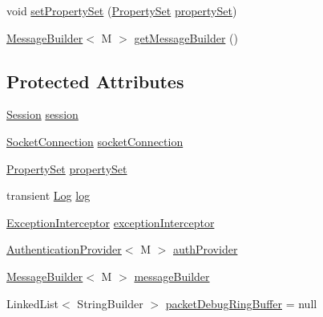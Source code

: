 \begin{DoxyCompactItemize}
\item 
void \mbox{\hyperlink{classcom_1_1mysql_1_1cj_1_1protocol_1_1_abstract_protocol_ae1541b6bfdeeba4b70d410e35cf2f11e}{set\+Property\+Set}} (\mbox{\hyperlink{interfacecom_1_1mysql_1_1cj_1_1conf_1_1_property_set}{Property\+Set}} \mbox{\hyperlink{classcom_1_1mysql_1_1cj_1_1protocol_1_1_abstract_protocol_a54dc78f51d6cf3388dfbee5b36814382}{property\+Set}})
\item 
\mbox{\hyperlink{interfacecom_1_1mysql_1_1cj_1_1_message_builder}{Message\+Builder}}$<$ M $>$ \mbox{\hyperlink{classcom_1_1mysql_1_1cj_1_1protocol_1_1_abstract_protocol_aa92b21db9b10b5cba115e5b774d07c0b}{get\+Message\+Builder}} ()
\end{DoxyCompactItemize}
\subsection*{Protected Attributes}
\begin{DoxyCompactItemize}
\item 
\mbox{\hyperlink{interfacecom_1_1mysql_1_1cj_1_1_session}{Session}} \mbox{\hyperlink{classcom_1_1mysql_1_1cj_1_1protocol_1_1_abstract_protocol_a6ec300f5f577fdb6d042e361b7b5c0f6}{session}}
\item 
\mbox{\hyperlink{interfacecom_1_1mysql_1_1cj_1_1protocol_1_1_socket_connection}{Socket\+Connection}} \mbox{\hyperlink{classcom_1_1mysql_1_1cj_1_1protocol_1_1_abstract_protocol_a0c3af4e90e3533ff217b0c1d1f238f2d}{socket\+Connection}}
\item 
\mbox{\hyperlink{interfacecom_1_1mysql_1_1cj_1_1conf_1_1_property_set}{Property\+Set}} \mbox{\hyperlink{classcom_1_1mysql_1_1cj_1_1protocol_1_1_abstract_protocol_a54dc78f51d6cf3388dfbee5b36814382}{property\+Set}}
\item 
transient \mbox{\hyperlink{interfacecom_1_1mysql_1_1cj_1_1log_1_1_log}{Log}} \mbox{\hyperlink{classcom_1_1mysql_1_1cj_1_1protocol_1_1_abstract_protocol_a3c27ad2f43100d6650c4a71b833190cc}{log}}
\item 
\mbox{\hyperlink{interfacecom_1_1mysql_1_1cj_1_1exceptions_1_1_exception_interceptor}{Exception\+Interceptor}} \mbox{\hyperlink{classcom_1_1mysql_1_1cj_1_1protocol_1_1_abstract_protocol_ab5ecaec9f4472c0cf0d01e4929e0f61e}{exception\+Interceptor}}
\item 
\mbox{\hyperlink{interfacecom_1_1mysql_1_1cj_1_1protocol_1_1_authentication_provider}{Authentication\+Provider}}$<$ M $>$ \mbox{\hyperlink{classcom_1_1mysql_1_1cj_1_1protocol_1_1_abstract_protocol_ae55f145d34e30891a841208ec5164c26}{auth\+Provider}}
\item 
\mbox{\hyperlink{interfacecom_1_1mysql_1_1cj_1_1_message_builder}{Message\+Builder}}$<$ M $>$ \mbox{\hyperlink{classcom_1_1mysql_1_1cj_1_1protocol_1_1_abstract_protocol_ad3f57d361262a559460fa992800e3ca8}{message\+Builder}}
\item 
Linked\+List$<$ String\+Builder $>$ \mbox{\hyperlink{classcom_1_1mysql_1_1cj_1_1protocol_1_1_abstract_protocol_a31e42f9f4426a1ca7e55e2d2d1fc6cce}{packet\+Debug\+Ring\+Buffer}} = null
\end{DoxyCompactItemize}


